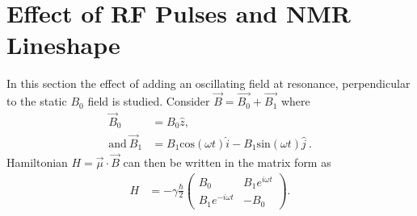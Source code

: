 \section{Effect of RF Pulses and NMR Lineshape\label{sec:rfpulse}}
In this section the effect of adding an oscillating field at
resonance, perpendicular to the static $B_0$ field is studied. Consider $\vec{B} = \vec{B_0} + \vec{B_1}$ where
%
\begin{equation}
\begin{split}
  \vec{B}_{0} &= B_{0} \hat{z}, \;\;\;\;\;\; \\
  \mathrm {and}~
\vec{B}_{1} &= B_{1}\textrm{cos}(\omega t) \hat{i} - B_{1} \textrm{sin} (\omega t) \hat{j}~.
\end{split}
\end{equation}
Hamiltonian $H = \vec{\mu}\cdot \vec{B}$ can then be written in the matrix form as
\begin{equation}
\begin{split}
  H &= -\gamma \frac{\hbar}{2} \begin{pmatrix} B_{0} & B_{1} e^{i\omega t} \\ B_{1}e^{-i\omega t} & -B_{0} \end{pmatrix}.
\end{split}
\end{equation}

